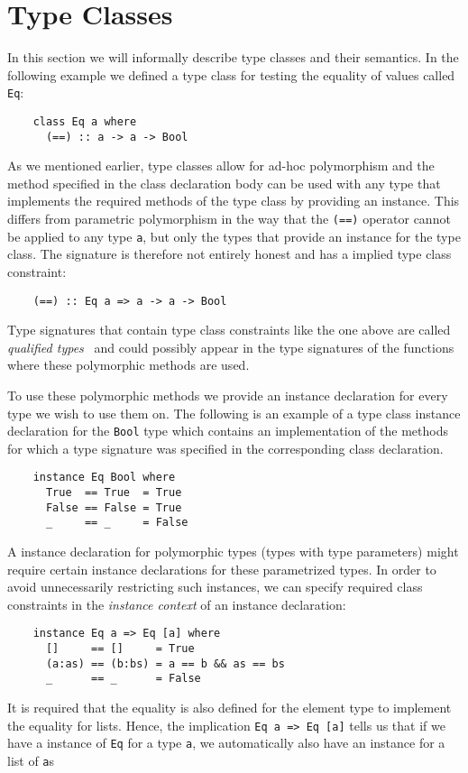 \section{Type Classes}
In this section we will informally describe type classes and their semantics. In the
following example we defined a type class for testing the equality of values
called \texttt{Eq}:

\begin{verbatim}
    class Eq a where
      (==) :: a -> a -> Bool
\end{verbatim}

As we mentioned earlier, type classes allow for ad-hoc polymorphism and the method
specified in the class declaration body can be used with any type that
implements the required methods of the type class by providing an instance.
This differs from parametric polymorphism in the way that the \texttt{(==)}
operator cannot be applied to any type \texttt{a}, but only the types that provide an
instance for the type class. The signature is therefore not entirely honest and
has a implied type class constraint:
\begin{verbatim}
    (==) :: Eq a => a -> a -> Bool
\end{verbatim}
Type signatures that contain type class constraints like the one above are called
\textit{qualified types}~\cite{JonesThesis} and could possibly appear in the type signatures of the
functions where these polymorphic methods are used.

To use these polymorphic methods we provide an instance declaration for every type
we wish to use them on. The following is an example of a type class instance
declaration for the \texttt{Bool} type which contains an implementation of the
methods for which a type signature was specified in the corresponding class
declaration.
\begin{verbatim}
    instance Eq Bool where
      True  == True  = True
      False == False = True
      _     == _     = False
\end{verbatim}

A instance declaration for polymorphic types (types with type parameters) might
require certain instance declarations for these parametrized types. In order to avoid unnecessarily restricting such instances,
we can specify required class constraints in the {\em instance context} of an instance declaration:
\begin{verbatim}
    instance Eq a => Eq [a] where
      []     == []     = True
      (a:as) == (b:bs) = a == b && as == bs
      _      == _      = False
\end{verbatim}
It is required that the equality is also defined for the element type to
implement the equality for lists. Hence, the implication \texttt{Eq a => Eq [a]}
tells us that if we have a instance of \texttt{Eq} for a type \texttt{a}, we
automatically also have an instance for a list of \texttt{a}s


